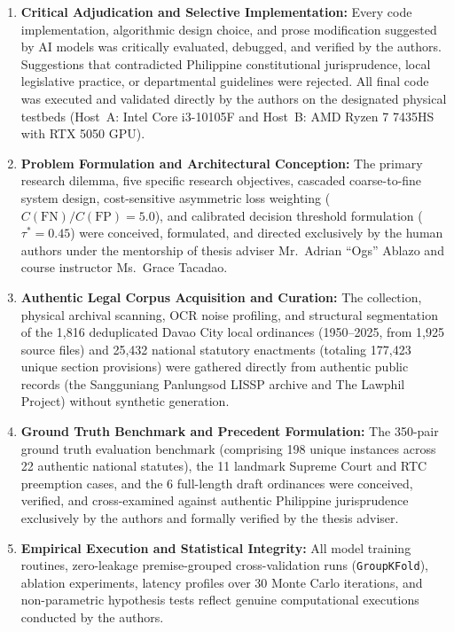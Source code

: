 \begin{enumerate}[leftmargin=2.0em, itemsep=4pt]
    \item \textbf{Critical Adjudication and Selective Implementation:} Every code implementation, algorithmic design choice, and prose modification suggested by AI models was critically evaluated, debugged, and verified by the authors. Suggestions that contradicted Philippine constitutional jurisprudence, local legislative practice, or departmental guidelines were rejected. All final code was executed and validated directly by the authors on the designated physical testbeds (Host~A: Intel Core i3-10105F and Host~B: AMD Ryzen 7 7435HS with RTX 5050 GPU).
    
    \item \textbf{Problem Formulation and Architectural Conception:} The primary research dilemma, five specific research objectives, cascaded coarse-to-fine system design, cost-sensitive asymmetric loss weighting ($C(\text{FN})/C(\text{FP}) = 5.0$), and calibrated decision threshold formulation ($\tau^* = 0.45$) were conceived, formulated, and directed exclusively by the human authors under the mentorship of thesis adviser Mr.~Adrian ``Ogs'' Ablazo and course instructor Ms.~Grace Tacadao.
    
    \item \textbf{Authentic Legal Corpus Acquisition and Curation:} The collection, physical archival scanning, OCR noise profiling, and structural segmentation of the 1,816 deduplicated Davao City local ordinances (1950--2025, from 1,925 source files) and 25,432 national statutory enactments (totaling 177,423 unique section provisions) were gathered directly from authentic public records (the Sangguniang Panlungsod LISSP archive and The Lawphil Project) without synthetic generation.
    
    \item \textbf{Ground Truth Benchmark and Precedent Formulation:} The 350-pair ground truth evaluation benchmark (comprising 198 unique instances across 22 authentic national statutes), the 11 landmark Supreme Court and RTC preemption cases, and the 6 full-length draft ordinances were conceived, verified, and cross-examined against authentic Philippine jurisprudence exclusively by the authors and formally verified by the thesis adviser.
    
    \item \textbf{Empirical Execution and Statistical Integrity:} All model training routines, zero-leakage premise-grouped cross-validation runs (\texttt{GroupKFold}), ablation experiments, latency profiles over 30 Monte Carlo iterations, and non-parametric hypothesis tests reflect genuine computational executions conducted by the authors.
\end{enumerate}

